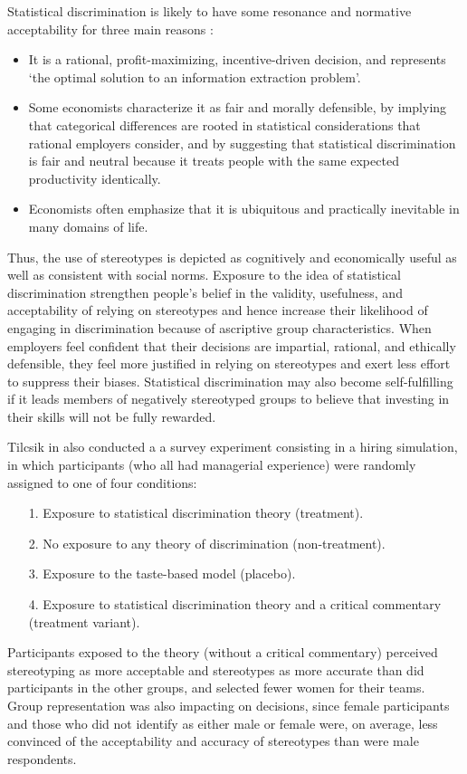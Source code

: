 Statistical discrimination is likely to have some resonance and normative acceptability for three main reasons \cite{tilcsik2021statistical}:
\begin{itemize}
\item It is a rational, profit-maximizing, incentive-driven decision, and represents `the optimal solution to an information extraction problem'.
\item Some economists characterize it as fair and morally defensible, by implying that categorical differences are rooted in statistical considerations that rational employers consider, and by suggesting that statistical discrimination is fair and neutral because it treats people with the same expected productivity identically.
\item Economists often emphasize that it is ubiquitous and practically inevitable in many domains of life.
\end{itemize}
Thus, the use of stereotypes is depicted as cognitively and economically useful as well as consistent with social norms. Exposure to the idea of statistical discrimination strengthen people's belief in the validity, usefulness, and acceptability of relying on stereotypes and hence increase their likelihood of engaging in discrimination because of ascriptive group characteristics. When employers feel confident that their decisions are impartial, rational, and ethically defensible, they feel more justified in relying on stereotypes and exert less effort to suppress their biases. Statistical discrimination may also become self-fulfilling if it leads members of negatively stereotyped groups to believe that investing in their skills will not be fully rewarded.

Tilcsik in \cite{tilcsik2021statistical} also conducted a a survey experiment consisting in a hiring simulation, in which participants (who all had managerial experience) were randomly assigned to one of four conditions:
\begin{itemize}
\item[1.] Exposure to statistical discrimination theory (treatment).
\item[2.] No exposure to any theory of discrimination (non-treatment).
\item[3.] Exposure to the taste-based model (placebo).
\item[4.] Exposure to statistical discrimination theory and a critical commentary (treatment variant).
\end{itemize}
Participants exposed to the theory (without a critical commentary) perceived stereotyping as more acceptable and stereotypes as more accurate than did participants in the other groups, and selected fewer women for their teams. Group representation was also impacting on decisions, since female participants and those who did not identify as either male or female were, on average, less convinced of the acceptability and accuracy of stereotypes than were male respondents.

